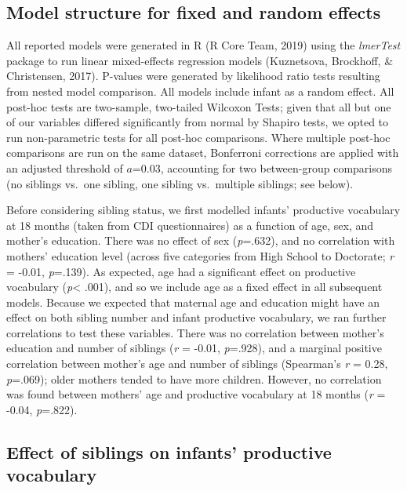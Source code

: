 \documentclass[
  english,
  man,floatsintext]{apa6}
\begin{document}
\hypertarget{model-structure-for-fixed-and-random-effects}{%
\subsection{Model structure for fixed and random effects}\label{model-structure-for-fixed-and-random-effects}}

All reported models were generated in R (R Core Team, 2019) using the \emph{lmerTest} package to run linear mixed-effects regression models (Kuznetsova, Brockhoff, \& Christensen, 2017). P-values were generated by likelihood ratio tests resulting from nested model comparison. All models include infant as a random effect. All post-hoc tests are two-sample, two-tailed Wilcoxon Tests; given that all but one of our variables differed significantly from normal by Shapiro tests, we opted to run non-parametric tests for all post-hoc comparisons. Where multiple post-hoc comparisons are run on the same dataset, Bonferroni corrections are applied with an adjusted threshold of \(a\)=0.03, accounting for two between-group comparisons (no siblings vs.~one sibling, one sibling vs.~multiple siblings; see below).

Before considering sibling status, we first modelled infants' productive vocabulary at 18 months (taken from CDI questionnaires) as a function of age, sex, and mother's education. There was no effect of sex (\emph{p}=.632), and no correlation with mothers' education level (across five categories from High School to Doctorate; \emph{r} = -0.01, \emph{p}=.139). As expected, age had a significant effect on productive vocabulary (\emph{p}\textless{} .001), and so we include age as a fixed effect in all subsequent models. Because we expected that maternal age and education might have an effect on both sibling number and infant productive vocabulary, we ran further correlations to test these variables. There was no correlation between mother's education and number of siblings (\emph{r} = -0.01, \emph{p}=.928), and a marginal positive correlation between mother's age and number of siblings (Spearman's \emph{r} = 0.28, \emph{p}=.069); older mothers tended to have more children. However, no correlation was found between mothers' age and productive vocabulary at 18 months (\emph{r} = -0.04, \emph{p}=.822).

\hypertarget{effect-of-siblings-on-infants-productive-vocabulary}{%
\subsection{Effect of siblings on infants' productive vocabulary}\label{effect-of-siblings-on-infants-productive-vocabulary}}
\end{document}
